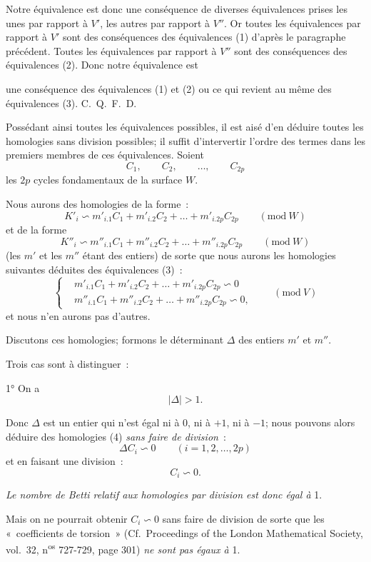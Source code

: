\documentclass{article}
\begin{document}
Notre équivalence est donc une conséquence de diverses équivalences prises les unes par rapport à $V'$, les autres par rapport à $V''$. Or toutes les équivalences par rapport à $V'$ sont des conséquences des équivalences (1) d'après le paragraphe précédent. Toutes les équivalences par rapport à $V''$ sont des conséquences des équivalences (2). Donc notre équivalence est

une conséquence des équivalences (1) et (2) ou ce qui revient au même des équivalences (3). C.~Q.~F.~D.

Possédant ainsi toutes les équivalences possibles, il est aisé d'en déduire toutes les homologies sans division possibles; il suffit d'intervertir l'ordre des termes dans les premiers membres de ces équivalences. Soient
\[ C_{1}, \qquad C_{2}, \qquad \ldots, \qquad C_{2p} \]
les $2p$ cycles fondamentaux de la surface $W$.

Nous aurons des homologies de la forme~:
\[ K'_{i} \backsim m'_{i.1} C_{1} + m'_{i.2} C_{2} + \ldots + m'_{i.2p} C_{2p} \qquad (\text{mod}\ W) \]
et de la forme
\[ K''_{i} \backsim m''_{i.1} C_{1} + m''_{i.2} C_{2} + \ldots + m''_{i.2p} C_{2p} \qquad (\text{mod}\ W) \]
(les $m'$ et les $m''$ étant des entiers) de sorte que nous aurons les homologies suivantes déduites des équivalences (3)~:
\[ \left\{ \begin{aligned} &m'_{i.1} C_{1} + m'_{i.2} C_{2} + \ldots + m'_{i.2p} C_{2p} \backsim 0\\ &m''_{i.1} C_{1} + m''_{i.2} C_{2} + \ldots + m''_{i.2p} C_{2p} \backsim 0, \end{aligned} \right. \qquad (\text{mod}\ V) \tag{4} \]
et nous n'en aurons pas d'autres.

Discutons ces homologies; formons le déterminant $\Delta$ des entiers $m'$ et $m''$.

Trois cas sont à distinguer~:

1° On a
\[ |\Delta| > 1. \]

Donc $\Delta$ est un entier qui n'est égal ni à 0, ni à $+1$, ni à $-1$; nous pouvons alors déduire des homologies (4) \emph{sans faire de division}~:
\[ \Delta C_{i} \backsim 0 \qquad (i = 1, 2, \ldots, 2p) \]
et en faisant une division~:
\[ C_{i} \backsim 0. \]

\emph{Le nombre de Betti relatif aux homologies par division est donc égal à} 1.

Mais on ne pourrait obtenir $C_{i} \backsim 0$ sans faire de division de sorte que les «~coefficients de torsion~» (Cf.\ Proceedings of the London Mathematical Society, vol.\ 32, n\textsuperscript{os} 727-729, page 301) \emph{ne sont pas égaux à} 1.
\end{document}
